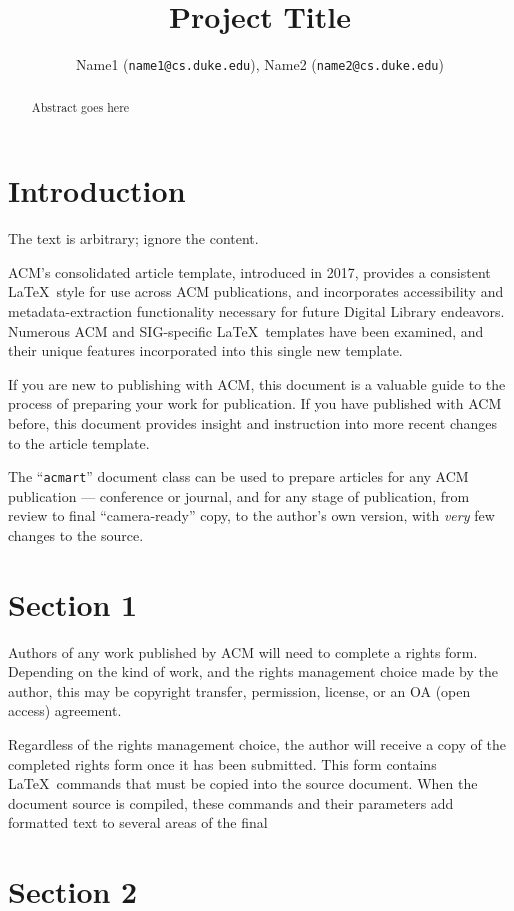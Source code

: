 \documentclass[conference]{IEEEtran}
\title{Project Title}
\author{Name1 (\texttt{name1@cs.duke.edu}), Name2 (\texttt{name2@cs.duke.edu})}
\begin{document}
\maketitle

\begin{abstract}
    Abstract goes here
\end{abstract}
\section{Introduction}
The text is arbitrary; ignore the content.

ACM's consolidated article template, introduced in 2017, provides a
consistent \LaTeX\ style for use across ACM publications, and
incorporates accessibility and metadata-extraction functionality
necessary for future Digital Library endeavors. Numerous ACM and
SIG-specific \LaTeX\ templates have been examined, and their unique
features incorporated into this single new template\cite{Abril07}.

If you are new to publishing with ACM, this document is a valuable
guide to the process of preparing your work for publication. If you
have published with ACM before, this document provides insight and
instruction into more recent changes to the article template.

The ``\verb|acmart|'' document class can be used to prepare articles
for any ACM publication --- conference or journal, and for any stage
of publication, from review to final ``camera-ready'' copy, to the
author's own version, with {\itshape very} few changes to the source.

\section{Section 1}
Authors of any work published by ACM will need to complete a rights
form. Depending on the kind of work, and the rights management choice
made by the author, this may be copyright transfer, permission,
license, or an OA (open access) agreement.

Regardless of the rights management choice, the author will receive a
copy of the completed rights form once it has been submitted. This
form contains \LaTeX\ commands that must be copied into the source
document. When the document source is compiled, these commands and
their parameters add formatted text to several areas of the final
\section{Section 2}


\end{document}
